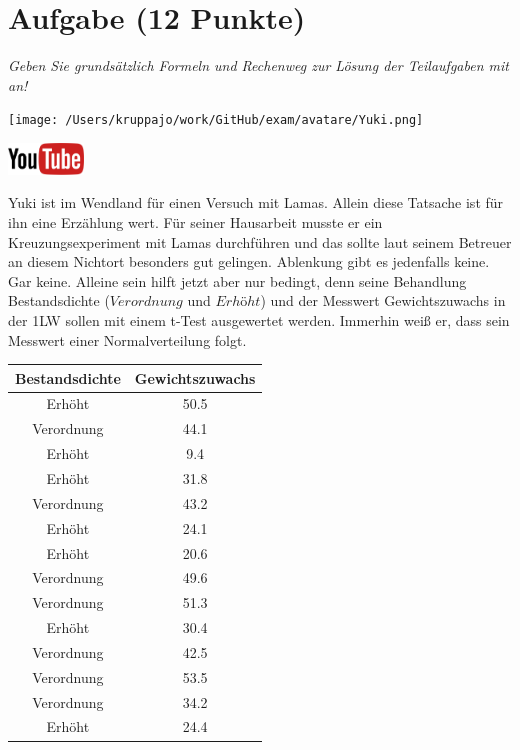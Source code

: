 \documentclass[a4paper, 9pt]{scrartcl}\usepackage[]{graphicx}\usepackage[]{xcolor}
\begin{document}
\section{Aufgabe \hfill (12 Punkte)}

\textit{Geben Sie grundsätzlich Formeln und Rechenweg zur Lösung der Teilaufgaben mit an!} \\[1Ex]
 

 
\begin{minipage}[t]{0.5\textwidth}
\texttt{[image: /Users/kruppajo/work/GitHub/exam/avatare/Yuki.png]}
\end{minipage}
\begin{minipage}[t]{0.5\textwidth}
\hfill
\href{https://youtu.be/Cq_rF_z4xOk}{\includegraphics[width = 2cm]{img/youtube}}\\[1Ex]
\end{minipage}
\vspace{1ex}



Yuki ist im Wendland für einen Versuch mit Lamas. Allein diese Tatsache ist für ihn eine Erzählung wert. Für seiner Hausarbeit musste er ein Kreuzungsexperiment mit Lamas durchführen und das sollte laut seinem Betreuer an diesem Nichtort besonders gut gelingen. Ablenkung gibt es jedenfalls keine. Gar keine. Alleine sein hilft jetzt aber nur bedingt, denn seine Behandlung Bestandsdichte ($Verordnung$ und $Erhöht$) und der Messwert Gewichtszuwachs in der 1LW sollen mit einem t-Test ausgewertet werden. Immerhin weiß er, dass sein Messwert einer Normalverteilung folgt. 

\begin{table}[!h]
\centering
\begin{tabular}{cc}
\toprule
Bestandsdichte & Gewichtszuwachs\\
\midrule
Erhöht & 50.5\\
Verordnung & 44.1\\
Erhöht & 9.4\\
Erhöht & 31.8\\
Verordnung & 43.2\\
\addlinespace
Erhöht & 24.1\\
Erhöht & 20.6\\
Verordnung & 49.6\\
Verordnung & 51.3\\
Erhöht & 30.4\\
\addlinespace
Verordnung & 42.5\\
Verordnung & 53.5\\
Verordnung & 34.2\\
Erhöht & 24.4\\
\bottomrule
\end{tabular}
\end{table}
\end{document}

